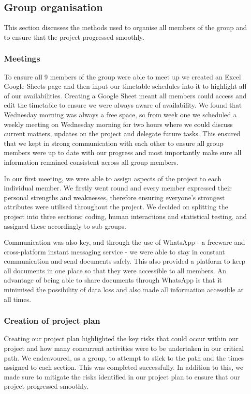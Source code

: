 \documentclass[a4paper,titlepage]{article}
\begin{document}
\subsection{Group organisation}
This section discusses the methods used to organise all members of the group and to ensure that the project progressed smoothly.

\subsubsection{Meetings}
To ensure all 9 members of the group were able to meet up we created an Excel Google Sheets page and then input our timetable schedules into it to highlight all of our availabilities. Creating a Google Sheet meant all members could access and edit the timetable to ensure we were always aware of availability. We found that Wednesday morning was always a free space, so from week one we scheduled a weekly meeting on Wednesday morning for two hours where we could discuss current matters, updates on the project and delegate future tasks. This ensured that we kept in strong communication with each other to ensure all group members were up to date with our progress and most importantly make sure all information remained consistent across all group members.

In our first meeting, we were able to assign aspects of the project to each individual member. We firstly went round and every member expressed their personal strengths and weaknesses, therefore ensuring everyone's strongest attributes were utilised throughout the project. We decided on splitting the project into three sections: coding, human interactions and statistical testing, and assigned these accordingly to sub groups.

Communication was also key, and through the use of WhatsApp - a freeware and cross-platform instant messaging service - we were able to stay in constant communication and send documents safely. This also provided a platform to keep all documents in one place so that they were accessible to all members. An advantage of being able to share documents through WhatsApp is that it minimised the possibility of data loss and also made all information accessible at all times.

\subsubsection{Creation of project plan}
Creating our project plan highlighted the key risks that could occur within our project and how many concurrent activities were to be undertaken in our critical path. We endeavoured, as a group, to attempt to stick to the path and the times assigned to each section. This was completed successfully.
In addition to this, we made sure to mitigate the risks identified in our project plan to ensure that our project progressed smoothly.
\end{document}
